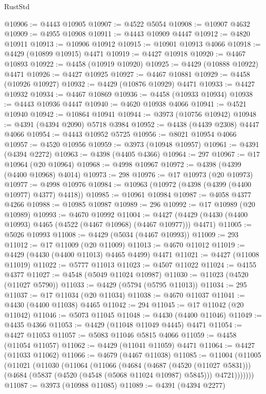 \begin{lexlean}{RustStd}
\begin{coremodule}
@10906 := @4443 @10905
@10907 := @4522 @5054
@10908 := @10907 @4632
@10909 := @4955 @10908
@10911 := @4443 @10909 @4447
@10912 := @4820 @10911
@10913 := @10906 @10912
@10915 := @10901 @10913 @4066
@10918 := @4429 (@10899 @10915) @4471
@10919 := @4427 @10918
@10920 := @4467 @10893
@10922 := @4458 (@10919 @10920)
@10925 := @4429 (@10888 @10922) @4471
@10926 := @4427 @10925
@10927 := @4467 @10881
@10929 := @4458 (@10926 @10927)
@10932 := @4429 (@10876 @10929) @4471
@10933 := @4427 @10932
@10934 := @4467 @10869
@10936 := @4458 (@10933 @10934)
@10938 := @4443 @10936 @4447
@10940 := @4620 @10938 @4066
@10941 := @4521 @10940
@10942 := @10864 @10941
@10944 := @3973 (@10756 @10942)
@10948 := @4391 (@4394 @2090) @5718 @3984
@10952 := @4438 (@4439 @2308) @4447 @4066
@10954 := @4443 @10952 @5725
@10956 := @8021 @10954 @4066
@10957 := @4520 @10956
@10959 := @3973 (@10948 @10957)
@10961 := @4391 (@4394 @2272)
@10963 := @4398 (@4405 @4366)
@10964 := 297
@10967 := @17 @10964 (@20 @10964)
@10968 := @4998 @10967
@10972 := @4398 (@4399 (@4400 @10968) @4014)
@10973 := 298
@10976 := @17 @10973 (@20 @10973)
@10977 := @4998 @10976
@10984 := @10963 (@10972 (@4398 (@4399 (@4400 @10977) @4377) @4418))
@10985 := @10961 @10984
@10987 := @4058 @4377 @4266
@10988 := @10985 @10987
@10989 := 296
@10992 := @17 @10989 (@20 @10989)
@10993 := @4670 @10992
@11004 := @4427 (@4429 (@4430 (@4400 @10993) @4465 (@4522 (@4467 @10968) (@4467 @10977))) @4471)
@11005 := @5026 @10993
@11008 := @4429 (@5034 (@4467 @10993))
@11009 := 293
@11012 := @17 @11009 (@20 @11009)
@11013 := @4670 @11012
@11019 := @4429 (@4430 (@4400 @11013) @4465 @4499) @4471
@11021 := @4427 (@11008 @11019)
@11022 := @5777 @11013
@11023 := @4507 @11022
@11024 := @4155 @4377
@11027 := @4548 (@5049 @11024 @10987)
@11030 := @11023 (@4520 (@11027 @5790))
@11033 := @4429 (@5794 (@5795 @11013))
@11034 := 295
@11037 := @17 @11034 (@20 @11034)
@11038 := @4670 @11037
@11041 := @4430 (@4400 @11038) @4465
@11042 := 294
@11045 := @17 @11042 (@20 @11042)
@11046 := @5073 @11045
@11048 := @4430 (@4400 @11046)
@11049 := @4435 @4366
@11053 := @4429 (@11048 @11049 @4445) @4471
@11054 := @4427 @11053
@11057 := @5083 @11046 @5815 @4066
@11059 := @4458 (@11054 @11057)
@11062 := @4429 (@11041 @11059) @4471
@11064 := @4427 (@11033 @11062)
@11066 := @4679 (@4467 @11038)
@11085 := @11004
    (@11005
      (@11021
        (@11030
          (@11064
            (@11066
              (@4684
                (@4687 (@4520 (@11027 @5831)))
                (@4684 (@5837 (@4520 (@4548 (@5068 @11024 @10987) @5845))) @4721)))))))
@11087 := @3973 (@10988 @11085)
@11089 := @4391 (@4394 @2277)

\end{coremodule}
\end{lexlean}

